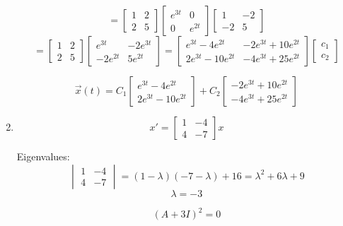 \documentclass[12pt]{article}
\begin{document}
\begin{enumerate}
    \[= \begin{bmatrix}
        1 & 2\\
        2 & 5
    \end{bmatrix}\begin{bmatrix}
        e^{3t} & 0\\
        0 & e^{2t}
    \end{bmatrix} \begin{bmatrix}
        1 & -2\\
        -2 & 5
    \end{bmatrix}\]
    \[= \begin{bmatrix}
        1 & 2\\
        2 & 5
    \end{bmatrix} \begin{bmatrix}
        e^{3t} & -2e^{3t}\\
        -2e^{2t} & 5e^{2t}
    \end{bmatrix} = \begin{bmatrix}
        e^{3t} - 4e^{2t} & -2e^{3t} + 10e^{2t}\\
        2e^{3t} - 10 e^{2t} & -4e^{3t} + 25e^{2t}
    \end{bmatrix} \begin{bmatrix}
        c_1\\c_2
    \end{bmatrix}\]

    \[\boxed{\vec{x}(t) = C_1 \begin{bmatrix}
        e^{3t} - 4e^{2t}\\
        2e^{3t} - 10 e^{2t}
    \end{bmatrix} + C_2 \begin{bmatrix}
        -2e^{3t} + 10e^{2t}\\
        -4e^{3t} + 25e^{2t}
    \end{bmatrix}}\]

    \item \[x' = \begin{bmatrix}
        1 & -4\\
        4 & -7
    \end{bmatrix} x\]

    Eigenvalues:
    \[\begin{vmatrix}
        1 & -4\\
        4 & -7
    \end{vmatrix} = (1-\lambda)(-7 - \lambda) + 16 = \lambda^2 + 6\lambda + 9\]
    \[\lambda = -3\]

    \[(A + 3I)^2 = 0\]
    

\end{enumerate}
\end{document}
